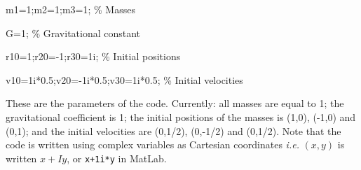 \documentclass[10pt]{article}
\newcommand{\ie}{\emph{i.e.} }
\begin{document}
%
\begin{ttfamily}
m1=1;m2=1;m3=1; \% Masses

G=1; \% Gravitational constant

r10=1;r20=-1;r30=1i; \% Initial positions

v10=1i*0.5;v20=-1i*0.5;v30=1i*0.5; \% Initial velocities
\end{ttfamily}


These are the parameters of the code. Currently: all masses are equal to 1; the gravitational coefficient is 1; the initial positions of the masses is (1,0), (-1,0) and (0,1); and the initial velocities are (0,1/2), (0,-1/2) and (0,1/2). Note that the code is written using complex variables as Cartesian coordinates \ie $(x,y)$ is written $x+Iy$, or \texttt{x+1i*y} in MatLab.
\end{document}
